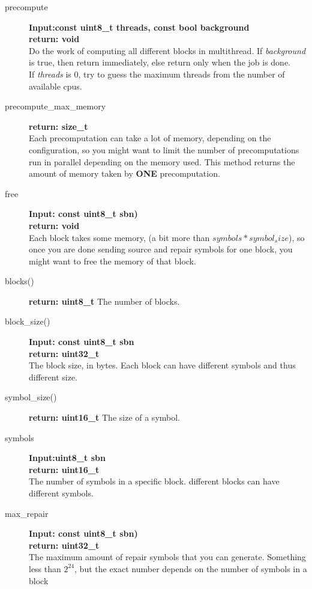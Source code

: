 \documentclass[11pt,a4paper]{refart}
\begin{document}
\begin{description}
\item[precompute] \textbf{Input:const uint8\_t threads, const bool background}\\
\textbf{return: void}\\
Do the work of computing all different blocks in multithread. If \textit{background} is true, then return immediately, else return only when the job is done.\\
If \textit{threads} is $0$, try to guess the maximum threads from the number of available cpus.

\item [precompute\_max\_memory] \textbf{return: size\_t}\\
Each precomputation can take a lot of memory, depending on the configuration, so you might want to limit the number of precomputations run in parallel
depending on the memory used. This method returns the amount of memory taken by \textbf{ONE} precomputation.

\item [free] \textbf{Input: const uint8\_t sbn)}\\
\textbf{return: void}\\
Each block takes some memory, (a bit more than $symbols * symbol_size$), so once you are done sending source and repair symbols for one block,
you might want to free the memory of that block.

\item[blocks()] \textbf{return: uint8\_t} The number of blocks.

\item[block\_size()] \textbf{Input: const uint8\_t sbn}\\
\textbf{return: uint32\_t}\\
The block size, in bytes. Each block can have different symbols and thus different size.

\item[symbol\_size()] \textbf{return: uint16\_t} The size of a symbol.

\item[symbols] \textbf{Input:uint8\_t sbn}\\
\textbf{return: uint16\_t}\\
The number of symbols in a specific block. different blocks can have different symbols.

\item[max\_repair] \textbf{Input: const uint8\_t sbn)}\\
\textbf{return: uint32\_t}\\
The maximum amount of repair symbols that you can generate. Something less than $2^{24}$, but the exact number depends on the number of symbols
in a block
\end{description}
\newpage
\end{document}
